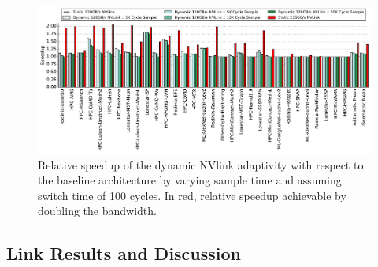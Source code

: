\begin{figure}[tp]
    \centering
    \includegraphics[width=1.0\textwidth]{figures/plot_nvlink_sample_time.pdf}
    \caption{Relative speedup of the dynamic NVlink adaptivity with respect to
	the baseline architecture by varying sample time and assuming switch 
time of
	100 cycles. In red, relative speedup achievable by doubling the 
bandwidth.}
    \label{fig:sampletime}
    \vspace{-.2in}
\end{figure}

\subsection{Link Results and Discussion} 

